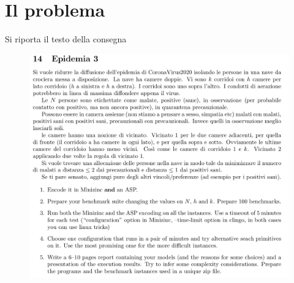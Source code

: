 
\section{Il problema}
Si riporta il testo della consegna
\begin{figure}[ht]
  \centering
  \includegraphics[width=\textwidth]{MUNINI}
\end{figure}
